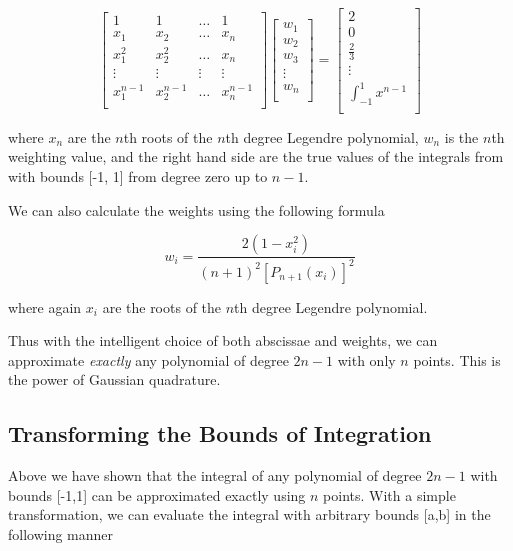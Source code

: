 \[
\begin{bmatrix}
1    & 1 &  \dots &1 \\
x_1      & x_2 &  \dots & x_n \\
x_1^2      & x_2^2 & \dots & x_n \\
\vdots & \vdots & \vdots & \vdots\\
x_1^{n-1}      & x_2^{n-1} & \dots & x_n^{n-1}\\
\end{bmatrix}
\begin{bmatrix}
w_1 \\
w_2 \\
w_3 \\
\vdots \\
w_n \\
\end{bmatrix}
=
\begin{bmatrix}
2  \\
0  \\
\frac{2}{3}  \\
\vdots \\
\int_{-1}^1 x^{n-1}  \\
\end{bmatrix}
\]

where $x_{n}$ are the $n$th roots of the $n$th degree Legendre polynomial, $w_n$ is the $n$th weighting value, and the right hand side are the true values of the integrals from with bounds [-1, 1] from degree zero up to $n-1$.

We can also calculate the weights using the following formula

\[ w_i = \frac{2(1-x_i^2)}{(n+1)^2 [P_{n+1}(x_i)]^2 } \]

where again $x_i$ are the roots of the $n$th degree Legendre polynomial.

Thus with the intelligent choice of both abscissae and weights, we can approximate \textit{exactly} any polynomial of degree $2n-1$ with only $n$ points. This is the power of Gaussian quadrature.

\subsection{Transforming the Bounds of Integration}

Above we have shown that the integral of any polynomial of degree $2n-1$ with bounds [-1,1] can be approximated exactly using $n$ points. With a simple transformation, we can evaluate the integral with arbitrary bounds [a,b] in the following manner

